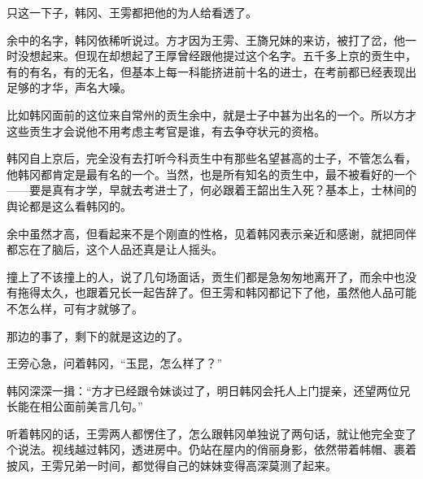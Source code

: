 只这一下子，韩冈、王雱都把他的为人给看透了。

余中的名字，韩冈依稀听说过。方才因为王雱、王旖兄妹的来访，被打了岔，他一时没想起来。但现在却想起了王厚曾经跟他提过这个名字。五千多上京的贡生中，有的有名，有的无名，但基本上每一科能挤进前十名的进士，在考前都已经表现出足够的才华，声名大噪。

比如韩冈面前的这位来自常州的贡生余中，就是士子中甚为出名的一个。所以方才这些贡生才会说他不用考虑主考官是谁，有去争夺状元的资格。

韩冈自上京后，完全没有去打听今科贡生中有那些名望甚高的士子，不管怎么看，他韩冈都肯定是最有名的一个。当然，也是所有知名的贡生中，最不被看好的一个——要是真有才学，早就去考进士了，何必跟着王韶出生入死？基本上，士林间的舆论都是这么看韩冈的。

余中虽然才高，但看起来不是个刚直的性格，见着韩冈表示亲近和感谢，就把同伴都忘在了脑后，这个人品还真是让人摇头。

撞上了不该撞上的人，说了几句场面话，贡生们都是急匆匆地离开了，而余中也没有拖得太久，也跟着兄长一起告辞了。但王雱和韩冈都记下了他，虽然他人品可能不怎么样，可有才就够了。

那边的事了，剩下的就是这边的了。

王旁心急，问着韩冈，“玉昆，怎么样了？”

韩冈深深一揖：“方才已经跟令妹谈过了，明日韩冈会托人上门提亲，还望两位兄长能在相公面前美言几句。”

听着韩冈的话，王雱两人都愣住了，怎么跟韩冈单独说了两句话，就让他完全变了个说法。视线越过韩冈，透进房中。仍站在屋内的俏丽身影，依然带着帏帽、裹着披风，王雱兄弟一时间，都觉得自己的妹妹变得高深莫测了起来。

